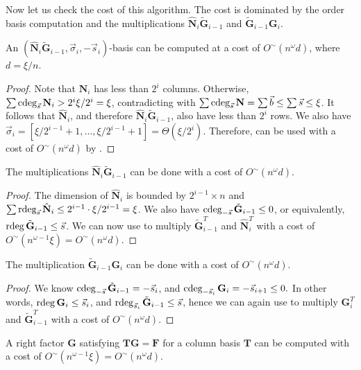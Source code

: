 Now let us check the cost of this algorithm. The cost is dominated
by the order basis computation and the multiplications $\hat{\mathbf{N}}_{i}\tilde{\mathbf{G}}_{i-1}$
and $\tilde{\mathbf{G}}_{i-1}\mathbf{G}_{i}$.
\begin{lem}
An $\left(\hat{\mathbf{N}}_{i}\tilde{\mathbf{G}}_{i-1},\vec{\sigma}_{i},-\vec{s}_{i}\right)$-basis
can be computed at a cost of $O^{\sim}\left(n^{\omega}d\right)$,
where $d=\xi/n$.\end{lem}
\begin{proof}
Note that $\mathbf{N}_{i}$ has less than $2^{i}$ columns. Otherwise,
$\sum\cdeg_{\vec{s}}\mathbf{N}_{i}>2^{i}\xi/2^{i}=\xi$, contradicting
with $\sum\cdeg_{\vec{s}}\mathbf{N}=\sum\vec{b}\le\sum\vec{s}\le\xi$.
It follows that $\hat{\mathbf{N}}_{i}$, and therefore $\hat{\mathbf{N}}_{i}\tilde{\mathbf{G}}_{i-1}$,
also have less than $2^{i}$ rows. We also have $\vec{\sigma}_{i}=\left[\xi/2^{i-1}+1,\dots,\xi/2^{i-1}+1\right]=\Theta\left(\xi/2^{i}\right)$.
Therefore,  can be used with a cost of $O^{\sim}\left(n^{\omega}d\right)$
by .\end{proof}
\begin{lem}
The multiplications $\hat{\mathbf{N}}_{i}\tilde{\mathbf{G}}_{i-1}$
can be done with a cost of $O^{\sim}\left(n^{\omega}d\right)$.\end{lem}
\begin{proof}
The dimension of $\hat{\mathbf{N}}_{i}$ is bounded by $2^{i-1}\times n$
and $\sum\rdeg_{\vec{s}}\hat{\mathbf{N}}_{i}\le2^{i-1}\cdot\xi/2^{i-1}=\xi$.
We also have $\cdeg_{-\vec{s}}\tilde{\mathbf{G}}_{i-1}\le0$, or equivalently,
$\rdeg\tilde{\mathbf{G}}_{i-1}\le\vec{s}$. We can now use 
to multiply $\tilde{\mathbf{G}}_{i-1}^{T}$ and $\hat{\mathbf{N}}_{i}^{T}$
with a cost of $O^{\sim}\left(n^{\omega-1}\xi\right)=O^{\sim}\left(n^{\omega}d\right)$.\end{proof}
\begin{lem}
The multiplication $\tilde{\mathbf{G}}_{i-1}\mathbf{G}_{i}$ can be
done with a cost of $O^{\sim}\left(n^{\omega}d\right)$.\end{lem}
\begin{proof}
We know $\cdeg_{-\vec{s}}\tilde{\mathbf{G}}_{i-1}=-\vec{s}_{i}$,
and $\cdeg_{-\vec{s}_{i}}\mathbf{G}_{i}=-\vec{s}_{i+1}\le0.$ In other
words, $\rdeg\mathbf{G}_{i}\le\vec{s}_{i}$, and $\rdeg_{\vec{s}_{i}}\tilde{\mathbf{G}}_{i-1}\le\vec{s}$,
hence we can again use 
to multiply $\mathbf{G}_{i}^{T}$ and $\tilde{\mathbf{G}}_{i-1}^{T}$
with a cost of $O^{\sim}\left(n^{\omega}d\right)$.\end{proof}
\begin{thm}
A right factor $\mathbf{G}$ satisfying $\mathbf{TG}=\mathbf{F}$
for a column basis $\mathbf{T}$ can be computed with a cost of $O^{\sim}\left(n^{\omega-1}\xi\right)=O^{\sim}\left(n^{\omega}d\right)$.
\end{thm}

